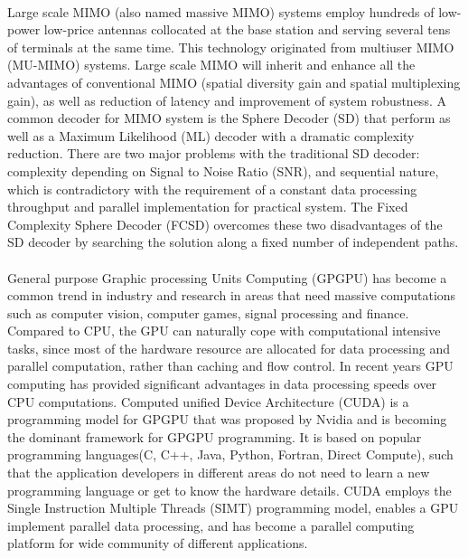 \documentclass[12pt,a4paper,final]{article}
\begin{document}
\begin{spacing}{2.5}
 \paragraph{} Large scale MIMO (also named massive MIMO) systems employ hundreds of low-power low-price antennas collocated at the base station and serving several tens of terminals at the same time\cite{rusek2013scaling}. This technology originated from multiuser MIMO (MU-MIMO) systems\cite{larsson2013massive}. Large scale MIMO will inherit and enhance all the advantages of conventional MIMO (spatial diversity gain and spatial multiplexing gain), as well as reduction of latency and improvement of system robustness. 
 A common decoder for MIMO system is the Sphere Decoder (SD) that perform as well as a Maximum Likelihood (ML) decoder with a dramatic complexity reduction\cite{viterbo1999universal}\cite{hassibi2005sphere}. There are two major problems with the traditional SD decoder: complexity depending on Signal to Noise Ratio (SNR), and sequential nature, which is contradictory with the requirement of a constant data processing throughput and parallel implementation for practical system. The Fixed Complexity Sphere Decoder (FCSD) overcomes these two disadvantages of the SD decoder by searching the solution along a fixed number of independent paths\cite{barbero2008fixing}.
\paragraph{}General purpose Graphic processing Units Computing (GPGPU) has become a common trend in industry and research in areas that need massive computations such as computer vision\cite{fung2008using}, computer games\cite{blewitt2013applicability}, signal processing\cite{van2011accelerating}\cite{6671435} and finance\cite{grauer2013accelerating}. Compared to CPU, the GPU can naturally cope with computational intensive tasks, since most of the hardware resource are allocated for data processing and parallel computation, rather than caching and flow control. In recent years GPU computing has provided significant advantages in data processing speeds over CPU computations\cite{nvidia2008programming}. Computed unified Device Architecture (CUDA) is a programming model for GPGPU that was proposed by Nvidia and is becoming the dominant framework for GPGPU programming. It is based on popular programming languages(C, C++, Java, Python, Fortran, Direct Compute), such that the application developers in different areas do not need to learn a new programming language or get to know the hardware details. CUDA employs the Single Instruction Multiple Threads (SIMT) programming model, enables a GPU implement parallel data processing, and has become a parallel computing platform for wide community of different applications.

\end{spacing}
\end{document}
